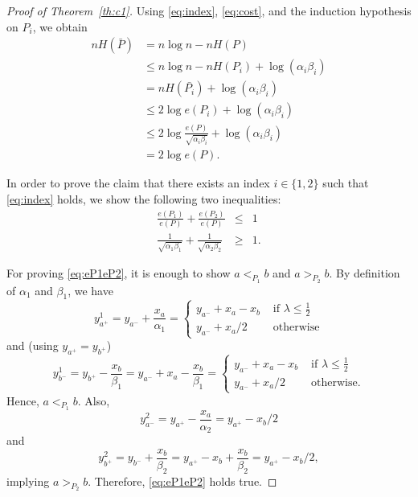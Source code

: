 \documentclass{article} \usepackage{fullpage}
\begin{document}
\begin{proof}[Proof of Theorem~\ref{th:c1}]
Using \eqref{eq:index}, \eqref{eq:cost}, and the induction hypothesis on $P_{i}$,
we obtain
\begin{align*}
nH(\bar P) &= n\log n - nH(P) \\
&\leq n\log n - nH(P_{i}) + \log\left( \alpha_{i}\beta_{i} \right) \\
&= nH(\bar{P_{i}}) + \log\left( \alpha_{i}\beta_{i} \right) \\
&\leq 2\log e(P_{i}) + \log\left( \alpha_{i}\beta_{i} \right) \\
&\leq 2\log \frac{e(P)}{\sqrt{\alpha_{i}\beta_{i}}} + \log\left( \alpha_{i}\beta_{i} \right) \\
&= 2\log e(P).
\end{align*}


In order to prove the claim that there exists an index $i\in\{1,2\}$ such that \eqref{eq:index} holds, we show the following two inequalities:
\begin{eqnarray}
\label{eq:eP1eP2}
\frac{e(P_{1})}{e(P)} + \frac{e(P_{2})}{e(P)} &\leq &1\\
\label{eq:roots}
\frac{1}{\sqrt{\alpha_{1}\beta_{1}}} +
\frac{1}{\sqrt{\alpha_{2}\beta_{2}}} &\geq &1.
\end{eqnarray}

For proving \eqref{eq:eP1eP2}, it is enough to show
$a <_{P_{1}} b$ and $a >_{P_{2}} b$.
By definition of $\alpha_{1}$ and $\beta_{1}$, we have
$$
y^{1}_{a^+} = y_{a^-} + \frac{x_{a}}{\alpha_{1}}
= \left\{
\begin{array}{ll}
y_{a^-} + x_{a} - x_{b}  & \textrm{ if } \lambda \leq \frac{1}{2} \\
y_{a^-} + x_{a}/2 & \textrm{ otherwise}
\end{array}
\right.
$$
and (using $y_{a^+} = y_{b^+}$)
$$
y^{1}_{b^-} = y_{b^+} - \frac{x_{b}}{\beta_{1}}
= y_{a^-} + x_{a} - \frac{x_{b}}{\beta_{1}}
= \left\{
\begin{array}{ll}
y_{a^-} + x_{a} - x_{b}  & \textrm{ if } \lambda \leq \frac{1}{2} \\
y_{a^-} + x_{a}/2 & \textrm{ otherwise.}
\end{array}
\right.
$$
Hence, $a <_{P_{1}} b$. Also,
$$
y^{2}_{a^-} = y_{a^+} - \frac{x_{a}}{\alpha_{2}} = y_{a^+} - x_{b} / 2
$$
and
$$
y^{2}_{b^+} = y_{b^-} + \frac{x_{b}}{\beta_{2}}
= y_{a^+} - x_{b} + \frac{x_{b}}{\beta_{2}}
= y_{a^+} - x_{b} / 2,
$$
implying $a >_{P_{2}} b$. Therefore, \eqref{eq:eP1eP2} holds true.


\end{proof}
\end{document}
